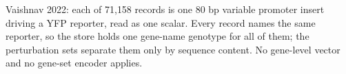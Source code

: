 Vaishnav 2022: each of 71{,}158 records is one 80 bp variable promoter insert driving a
YFP reporter, read as one scalar. Every record names the same reporter, so the store
holds one gene-name genotype for all of them; the perturbation sets separate them only
by sequence content. No gene-level vector and no gene-set encoder applies.
